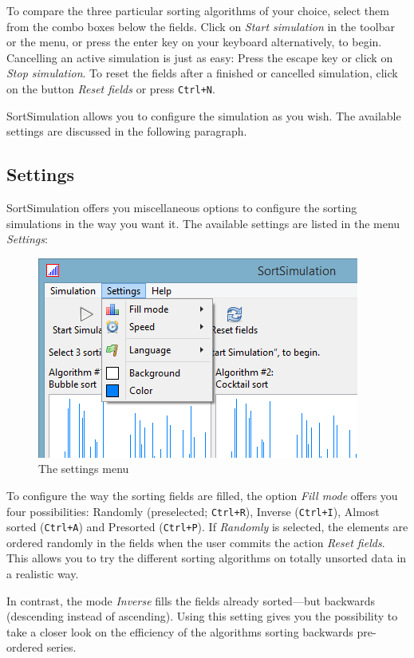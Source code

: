 \documentclass[nobranding]{pfBook}
\begin{document}
	To compare the three particular sorting algorithms of your choice, select them from the combo boxes below the fields. Click on \emph{Start simulation} in the toolbar or the menu, or press the enter key on your keyboard alternatively, to begin. Cancelling an active simulation is just as easy: Press the escape key or click on \emph{Stop simulation}. To reset the fields after a finished or cancelled simulation, click on the button \emph{Reset fields} or press \texttt{Ctrl+N}.
	
	SortSimulation allows you to configure the simulation as you wish. The available settings are discussed in the following paragraph.
	
	\subsection{Settings}
	
	SortSimulation offers you miscellaneous options to configure the sorting simulations in the way you want it. The available settings are listed in the menu \emph{Settings}:
	
	\begin{figure}[h]
		\centering
		\includegraphics[scale=0.6]{images/image1.png}
		\caption{The settings menu}
	\end{figure}
	
	To configure the way the sorting fields are filled, the option \emph{Fill mode} offers you four possibilities: Randomly (preselected; \texttt{Ctrl+R}), Inverse (\texttt{Ctrl+I}), Almost sorted (\texttt{Ctrl+A}) and Presorted (\texttt{Ctrl+P}). If \emph{Randomly} is selected, the elements are ordered randomly in the fields when the user commits the action \emph{Reset fields}. This allows you to try the different sorting algorithms on totally unsorted data in a realistic way.
	
	In contrast, the mode \emph{Inverse} fills the fields already sorted---but backwards (descending instead of ascending). Using this setting gives you the possibility to take a closer look on the efficiency of the algorithms sorting backwards pre-ordered series.
	
\end{document}
